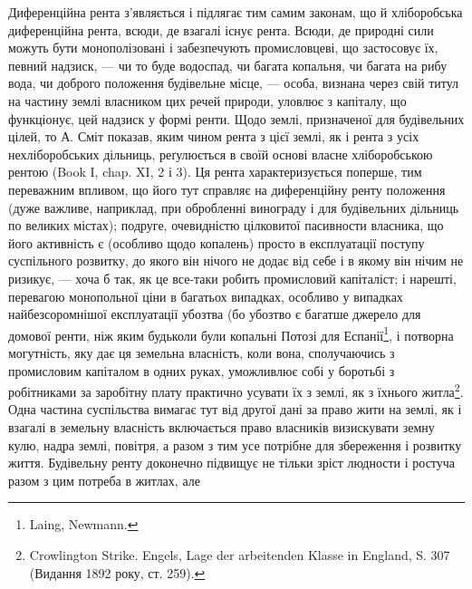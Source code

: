 Диференційна рента з’являється і підлягає тим самим законам, що й хліборобська
диференційна рента, всюди, де взагалі існує рента. Всюди, де природні
сили можуть бути монополізовані і забезпечують промисловцеві, що застосовує
їх, певний надзиск, — чи то буде водоспад, чи багата копальня, чи багата на
рибу вода, чи доброго положення будівельне місце, — особа, визнана через
свій титул на частину землі власником цих речей природи, уловлює з капіталу,
що функціонує, цей надзиск у формі ренти. Щодо землі, призначеної для будівельних
цілей, то А. Сміт показав, яким чином рента з цієї землі, як і рента
з усіх нехліборобських дільниць, реґулюється в своїй основі власне хліборобською
рентою (Book I, chap. XI, 2 і 3). Ця рента характеризується поперше, тим
переважним впливом, що його тут справляє на диференційну ренту положення
(дуже важливе, наприклад, при обробленні винограду і для будівельних дільниць
по великих містах); подруге, очевидністю цілковитої пасивности власника, що його
активність є (особливо щодо копалень) просто в експлуатації поступу суспільного
розвитку, до якого він нічого не додає від себе і в якому він нічим не
ризикує, — хоча б так, як це все-таки робить промисловий капіталіст; і нарешті,
перевагою монопольної ціни в багатьох випадках, особливо у випадках
найбезсоромнішої експлуатації убозтва (бо убозтво є багатше джерело для
домової ренти, ніж яким будьколи були копальні Потозі для Еспанії\footnote{
Laing, Newmann.
},
і потворна могутність, яку дає ця земельна власність, коли вона, сполучаючись
з промисловим капіталом в одних руках, уможливлює собі у боротьбі з робітниками
за заробітну плату практично усувати їх з землі, як з їхнього
житла\footnote{
Crowlington Strike. Engels, Lage der arbeitenden Klasse in England, S. 307 (Видання
1892 року, ст. 259).
}. Одна частина суспільства вимагає тут від другої дані за право
жити на землі, як і взагалі в земельну власність включається право власників
визискувати земну кулю, надра землі, повітря, а разом з тим усе
потрібне для збереження і розвитку життя. Будівельну ренту доконечно підвищує
не тільки зріст людности і ростуча разом з цим потреба в житлах, але
\parbreak{}  %
